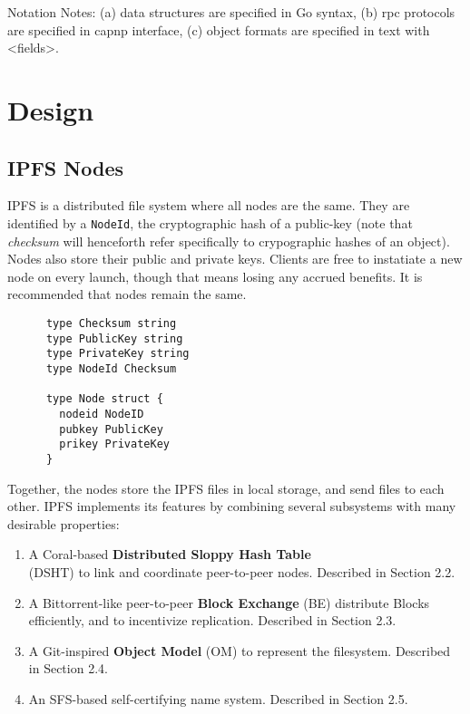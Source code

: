 \documentclass{sig-alternate}
\begin{document}
Notation Notes:
(a) data structures are specified in Go syntax,
(b) rpc protocols are specified in capnp interface,
(c) object formats are specified in text with <fields>.



\section{Design}

\subsection{IPFS Nodes}

IPFS is a distributed file system where all nodes are the same. They are
identified by a \texttt{NodeId}, the cryptographic hash of a public-key
(note that \textit{checksum} will henceforth refer specifically to crypographic
hashes of an object). Nodes also store their public and private keys. Clients
are free to instatiate a new node on every launch, though that means losing any
accrued benefits. It is recommended that nodes remain the same.

\begin{verbatim}
      type Checksum string
      type PublicKey string
      type PrivateKey string
      type NodeId Checksum

      type Node struct {
        nodeid NodeID
        pubkey PublicKey
        prikey PrivateKey
      }
\end{verbatim}


Together, the
nodes store the IPFS files in local storage, and send files to each other.
IPFS implements its features by combining several subsystems with many
desirable properties:

\begin{enumerate}
  \item A Coral-based \textbf{Distributed Sloppy Hash Table}\\
        (DSHT) to link and coordinate peer-to-peer nodes.
        Described in Section 2.2.
  \item A Bittorrent-like peer-to-peer \textbf{Block Exchange} (BE) distribute
        Blocks efficiently, and to incentivize replication.
        Described in Section 2.3.
  \item A Git-inspired \textbf{Object Model} (OM) to represent the filesystem.
        Described in Section 2.4.
  \item An SFS-based self-certifying name system.
        Described in Section 2.5.
\end{enumerate}
\end{document}

